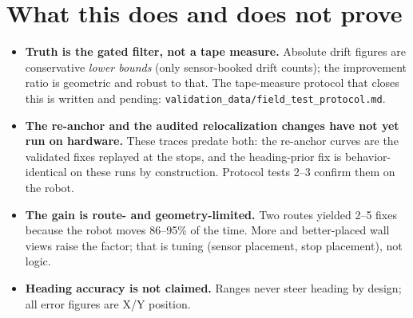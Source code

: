 \documentclass[11pt]{article}
\begin{document}
\section{What this does and does not prove}
\begin{tcolorbox}[enhanced, colback=paneldrift, colframe=drift!55, boxrule=0.7pt,
  arc=3pt, left=9pt, right=9pt, top=7pt, bottom=7pt]
\begin{itemize}[leftmargin=1.3em]
  \item \textbf{Truth is the gated filter, not a tape measure.} Absolute drift
  figures are conservative \emph{lower bounds} (only sensor-booked drift counts);
  the improvement ratio is geometric and robust to that. The tape-measure protocol
  that closes this is written and pending: \texttt{validation\_data/field\_test\_protocol.md}.
  \item \textbf{The re-anchor and the audited relocalization changes have not yet
  run on hardware.} These traces predate both: the re-anchor curves are the
  validated fixes replayed at the stops, and the heading-prior fix is
  behavior-identical on these runs by construction. Protocol tests 2--3 confirm them
  on the robot.
  \item \textbf{The gain is route- and geometry-limited.} Two routes yielded
  \numrange{2}{5} fixes because the robot moves \numrange{86}{95}\% of the time.
  More and better-placed wall views raise the factor; that is tuning
  (sensor placement, stop placement), not logic.
  \item \textbf{Heading accuracy is not claimed.} Ranges never steer heading by
  design; all error figures are X/Y position.
\end{itemize}
\end{tcolorbox}

\vspace{0.5em}
\end{document}

